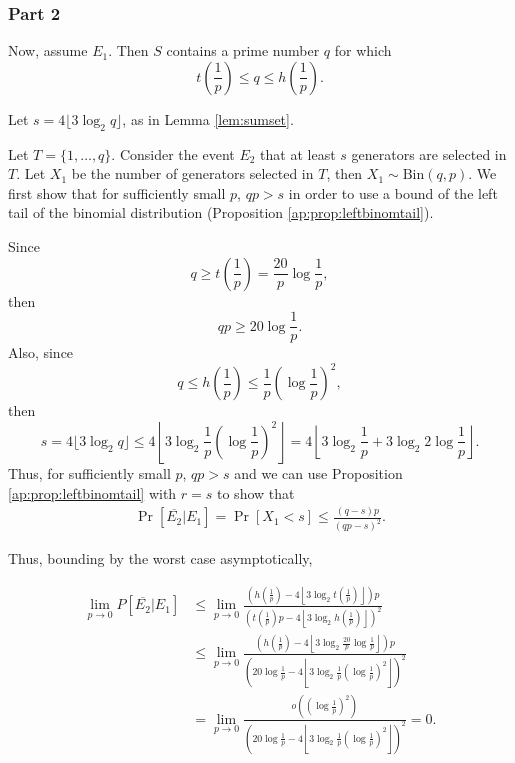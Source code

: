 \subsubsection*{Part 2}

Now, assume $E_1$. Then $S$ contains a prime number $q$ for which 
\[t\left(\frac{1}{p}\right) \leq q \leq h\left(\frac{1}{p}\right).\]
\par Let $s = 4\lfloor3\log_2 q \rfloor$, as in Lemma \ref{lem:sumset}. 
\par Let $T = \{1, \ldots,  q\}$. Consider the event $E_2$ that at least $s$ generators are selected in $T$. Let $X_1$ be the number of generators selected in $T$, then $X_1 \sim \mathrm{Bin}(q, p)$. We first show that for sufficiently small $p$, $qp > s$ in order to use a bound of the left tail of the binomial distribution (Proposition \ref{ap:prop:leftbinomtail}). \par
Since 
\[q \geq t\left(\frac{1}{p}\right) = \frac{20}{p}\log\frac{1}{p},\]
then 
\begin{equation*}
qp \geq 20\log\frac{1}{p}.
\end{equation*}
Also, since 
\[q \leq h\left(\frac{1}{p}\right) \leq \frac{1}{p}\left(\log\frac{1}{p}\right)^2,\]
then
\[s = 4\lfloor3\log_2 q \rfloor \leq 4\left\lfloor3\log_2 \frac{1}{p}\left(\log\frac{1}{p}\right)^2 \right\rfloor = 4\left\lfloor3\log_2 \frac{1}{p} + 3\log_2 2\log\frac{1}{p} \right\rfloor.\]
Thus, for sufficiently small $p$, $qp> s$ and we can use Proposition \ref{ap:prop:leftbinomtail} with $r = s$ to show that
\begin{align*}
    \Pr[ \overline{E_2}  | E_1] = \Pr\left[X_1 < s\right] \leq \frac{(q - s)p}{(qp - s)^2}.
\end{align*}
\par Thus, bounding by the worst case asymptotically, 

\begin{align*}
    \lim_{p \to 0} P[\overline{E_2} | E_1] &\leq \lim_{p \to 0}\frac{\left(h\left(\frac{1}{p}\right) - 4\left\lfloor3\log_2 t\left(\frac{1}{p}\right) \right\rfloor\right)p}{\left(t\left(\frac{1}{p}\right)p - 4\left\lfloor3\log_2 h\left(\frac{1}{p}\right) \right\rfloor\right)^2} \\
    &\leq \lim_{p \to 0}\frac{\left(h\left(\frac{1}{p}\right) - 4\left\lfloor3\log_2 \frac{20}{p}\log\frac{1}{p} \right\rfloor\right)p}{\left(20\log\frac{1}{p} - 4\left\lfloor3\log_2 \frac{1}{p}\left(\log\frac{1}{p}\right)^2 \right\rfloor\right)^2}\\
    &=\lim_{p \to 0} \frac{o\left(\left(\log\frac{1}{p}\right)^2\right)}{\left(20\log\frac{1}{p} - 4\left\lfloor3\log_2 \frac{1}{p}\left(\log\frac{1}{p}\right)^2 \right\rfloor\right)^2} = 0.
\end{align*}

